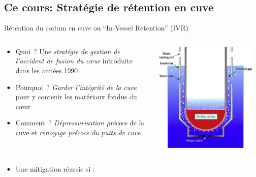 \subsection{Ce cours: Stratégie de rétention en cuve}
\begin{frame}[fragile]
Rétention du corium en cuve ou ``In-Vessel Retention'' (IVR)
\begin{columns}
\begin{column}{0.7\textwidth}
\begin{itemize}
\item Quoi~? Une \emph{stratégie de gestion de l'accident de fusion du c\oe ur} introduite dans les années 1990 \cite{Henry1993,Tuomisto1994}
\item Pourquoi~? \emph{Garder l'intégrité de la cuve} pour y contenir les matériaux fondus du c\oe ur
\item Comment~? \emph{Dépressurisation précoce} de la cuve et \emph{renoyage précoce du puits de cuve} 
\end{itemize}
\end{column}
\begin{column}{0.3\textwidth}
\centering \includegraphics[height=0.5\textheight]{Figures/ivr.jpg}
\end{column}
\end{columns}
\begin{itemize}
\item Une mitigation réussie si :
\begin{itemize}

\end{itemize}
\end{itemize}
\end{frame}
